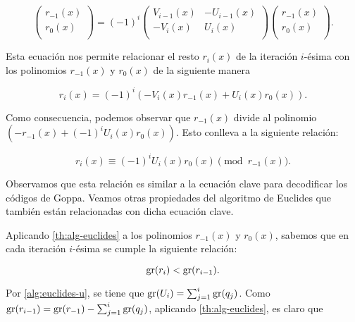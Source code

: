 \[
    \left( 
        \begin{array}{c}  
            r_{-1}(x) \\
            r_{0}(x) \\
        \end{array} 
    \right)
    = 
    (-1)^i
    \left( 
        \begin{array}{cc}  
            V_{i-1}(x) & -U_{i-1}(x) \\
            -V_i(x) & U_{i}(x) \\
        \end{array} 
    \right)
    \left( 
        \begin{array}{c}  
            r_{-1}(x) \\
            r_{0}(x) \\
        \end{array} 
    \right).
\]

Esta ecuación nos permite relacionar el resto $r_i(x)$ de la iteración $i$-ésima con los polinomios $r_{-1}(x)$ y $r_0(x)$ de la siguiente manera

\begin{equation}
    \label{prop:relacion-r_i}
    r_i(x) = (-1)^i \left( -V_i(x) r_{-1}(x) + U_i(x) r_0(x) \right).
\end{equation}

Como consecuencia, podemos observar que $r_{-1}(x)$ divide al polinomio $\left( -r_{-1}(x) + (-1)^i U_i(x) r_0(x) \right)$. Esto conlleva a la siguiente relación:

\begin{equation}
    \label{prop:euclides-resto}
    r_i(x) \equiv (-1)^i U_i(x) r_0(x) \pmod{r_{-1}(x)}.
\end{equation}

Observamos que esta relación es similar a la ecuación clave para decodificar los códigos de Goppa. Veamos otras propiedades del algoritmo de Euclides que también están relacionadas con dicha ecuación clave.

Aplicando \ref{th:alg-euclides} a los polinomios $r_{-1}(x)$ y $r_0(x)$, sabemos que en cada iteración $i$-ésima se cumple la siguiente relación:

\begin{equation}
    \label{prop:euclides-grados}
    \operatorname{gr}(r_i) < \operatorname{gr}(r_{i-1}).
\end{equation}

Por \eqref{alg:euclides-u}, se tiene que $\operatorname{gr}(U_i) = \sum_{j=1}^i \operatorname{gr}(q_j)$. Como $\operatorname{gr}(r_{i-1}) = \operatorname{gr}(r_{-1}) - \sum_{j=1}^i \operatorname{gr}(q_j)$, aplicando \ref{th:alg-euclides}, es claro que

